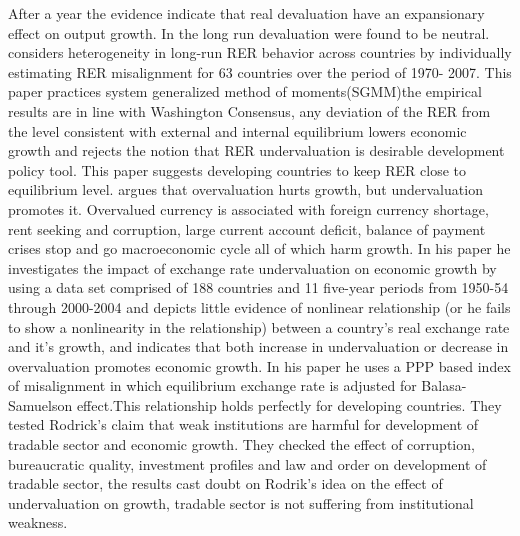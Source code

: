 \documentclass{article}
\begin{document}
After a year the evidence indicate that real devaluation have an expansionary effect on output growth. In the long run devaluation were found to be neutral. \cite{schroder2013should} considers heterogeneity in long-run RER behavior across countries by individually estimating RER misalignment for 63 countries over the period of 1970- 2007. This paper practices system generalized method of moments(SGMM)the empirical results are in line with Washington Consensus, any deviation of the RER from the level consistent with external and internal equilibrium lowers economic growth and rejects the notion that RER undervaluation is desirable development policy tool. This paper suggests developing countries to keep RER close to equilibrium level. \cite{rodrik2008real} argues that overvaluation hurts growth, but undervaluation promotes it. Overvalued currency is associated with foreign currency shortage, rent seeking and corruption, large current account deficit, balance of payment crises stop and go macroeconomic cycle all of which harm growth. In his paper he investigates the impact of exchange rate undervaluation on economic growth by using a data set comprised of 188 countries and 11 five-year periods from 1950-54 through 2000-2004 and depicts little evidence of nonlinear relationship (or he fails to show a nonlinearity in the relationship) between a country’s real exchange rate and it’s growth, and indicates that both increase in undervaluation or decrease in overvaluation promotes economic growth. In his paper he uses a PPP based index of misalignment in which equilibrium exchange rate is adjusted for Balasa-Samuelson effect.This relationship holds perfectly for developing countries. \cite{quundervaluation} 
They tested Rodrick’s claim that weak institutions are harmful for development of tradable sector and economic growth. They checked the effect of corruption, bureaucratic quality, investment profiles and law and order on development of tradable sector, the results cast doubt on Rodrik’s idea on the effect of undervaluation on growth, tradable sector is not suffering from institutional weakness.\\
\cite{gala2007real}  
\end{document}
